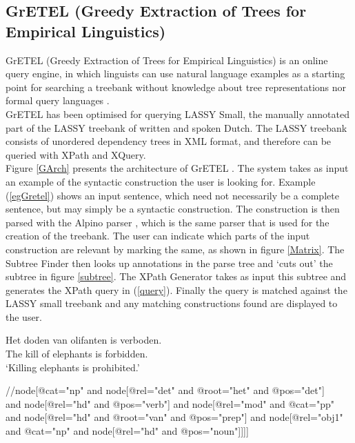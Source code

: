 \documentclass[]{scrartcl}
\theoremstyle{exmp}
\begin{document}
\subsection{GrETEL (Greedy Extraction of Trees for Empirical Linguistics)}\label{Gretel}
GrETEL (Greedy Extraction of Trees for Empirical Linguistics) is an online query engine, in which linguists can use natural language examples as a starting point for searching a treebank without knowledge about tree representations nor formal query languages \cite{GrETEL}. \\
GrETEL has been optimised for querying LASSY Small, the manually annotated part of the LASSY treebank \cite{LASSY} of written and spoken Dutch. The LASSY treebank consists of unordered dependency trees in XML format, and therefore can be queried with XPath and XQuery.\\
Figure \ref{GArch} presents the architecture of GrETEL \cite{GrETEL}. The system takes as input an example of the syntactic construction the user is looking for. Example (\ref{egGretel}) shows an input sentence, which need not necessarily be a complete sentence, but may simply be a syntactic construction. The construction is then parsed with the Alpino parser \cite{Alpino}, which is the same parser that is used for the creation of the treebank. The user can indicate which parts of the input construction are relevant by marking the same, as shown in figure \ref{Matrix}. The Subtree Finder then looks up annotations in the parse tree and `cuts out' the subtree in figure \ref{subtree}. The XPath Generator takes as input this subtree and generates the XPath query in (\ref{query}). Finally the query is matched against the LASSY small treebank and any matching constructions found are displayed to the user.\\

\begin{exe}
	\ex \label{egGretel}
	\gll Het doden van olifanten is verboden. \\
	The kill of elephants is forbidden. \\
	\trans `Killing elephants is prohibited.'
\end{exe}

\begin{exe}
	\ex \label{query}
	//node[@cat="np" and node[@rel="det" and @root="het" and @pos="det"] \\
	and node[@rel="hd" and @pos="verb"] and node[@rel="mod" and @cat="pp" \\
	and node[@rel="hd" and @root="van" and @pos="prep"] and node[@rel="obj1" \\
	and @cat="np" and node[@rel="hd" and @pos="noun"]]]]
\end{exe}
\end{document}
